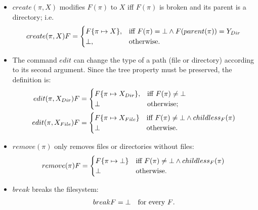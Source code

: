 \begin{notrsi}
\begin{itemize}
\item
\(create(\pi,X)\) modifies \(F(\pi)\) to \(X\) iff
\(F(\pi)\) is broken and its parent is a directory; i.e.
\[create(\pi,X)F=
\begin{cases}
F\{\pi\mapsto X\}, &\mbox{iff~} F(\pi)=\bot
\wedge F(parent(\pi))=Y_{Dir}\\
\bot, &\mbox{otherwise.}
\end{cases}\]
\item
The command \(edit\) can change the type of a path (file or
directory) according to its second argument.
Since the tree property must be preserved, the definition is:
\begin{align*}
edit(\pi,X_{Dir})F&=
\begin{cases}
F\{\pi\mapsto X_{Dir}\}, &\mbox{iff~}
F(\pi)\neq\bot\\
\bot &\mbox{otherwise;}
\end{cases}\\
edit(\pi,X_{File})F&=
\begin{cases}
F\{\pi\mapsto X_{File}\} &\mbox{iff~}
F(\pi)\neq\bot\wedge childless_F(\pi)\\
\bot &\mbox{otherwise.}
\end{cases}
\end{align*}
\item
\(remove(\pi)\) only removes files or directories without files:
\[remove(\pi)F=
\begin{cases}  
F\{\pi\mapsto\bot\} &\mbox{iff~}
F(\pi)\neq\bot \wedge childless_F(\pi)\\
\bot &\mbox{otherwise.}
\end{cases}\]
\item
\(break\) breaks the filesystem:
\[\begin{array}{r@{}ll}
breakF&{}=\ud &\mbox{for every $F$.}\end{array}\]
\end{itemize}
\end{notrsi}
%
